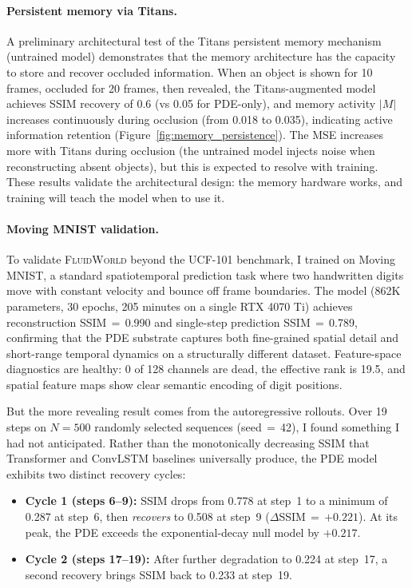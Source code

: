 \documentclass{article}
\newcommand{\fluidworld}{\textsc{FluidWorld}}
\begin{document}
\paragraph{Persistent memory via Titans.}
A preliminary architectural test of the Titans persistent memory mechanism (untrained model) demonstrates that the memory architecture has the capacity to store and recover occluded information. When an object is shown for 10 frames, occluded for 20 frames, then revealed, the Titans-augmented model achieves SSIM recovery of 0.6 (vs 0.05 for PDE-only), and memory activity $|M|$ increases continuously during occlusion (from 0.018 to 0.035), indicating active information retention (Figure~\ref{fig:memory_persistence}). The MSE increases more with Titans during occlusion (the untrained model injects noise when reconstructing absent objects), but this is expected to resolve with training. These results validate the architectural design: the memory hardware works, and training will teach the model when to use it.

\paragraph{Moving MNIST validation.}
To validate \fluidworld{} beyond the UCF-101 benchmark, I trained on Moving MNIST, a standard spatiotemporal prediction task where two handwritten digits move with constant velocity and bounce off frame boundaries. The model (862K parameters, 30 epochs, 205 minutes on a single RTX 4070 Ti) achieves reconstruction SSIM\,$=$\,0.990 and single-step prediction SSIM\,$=$\,0.789, confirming that the PDE substrate captures both fine-grained spatial detail and short-range temporal dynamics on a structurally different dataset. Feature-space diagnostics are healthy: 0 of 128 channels are dead, the effective rank is 19.5, and spatial feature maps show clear semantic encoding of digit positions.

But the more revealing result comes from the autoregressive rollouts. Over 19 steps on $N\!=\!500$ randomly selected sequences (seed\,$=$\,42), I found something I had not anticipated. Rather than the monotonically decreasing SSIM that Transformer and ConvLSTM baselines universally produce, the PDE model exhibits two distinct recovery cycles:

\begin{itemize}
    \item \textbf{Cycle 1 (steps 6--9):} SSIM drops from 0.778 at step~1 to a minimum of 0.287 at step~6, then \emph{recovers} to 0.508 at step~9 ($\Delta$SSIM\,$=$\,$+0.221$). At its peak, the PDE exceeds the exponential-decay null model by $+0.217$.
    \item \textbf{Cycle 2 (steps 17--19):} After further degradation to 0.224 at step~17, a second recovery brings SSIM back to 0.233 at step~19.
\end{itemize}
\end{document}
